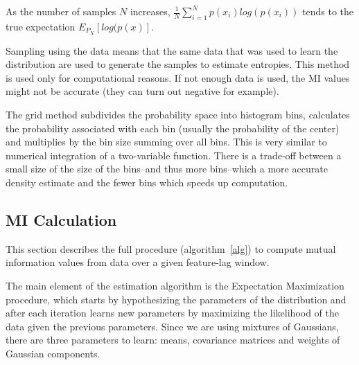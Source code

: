 \documentclass{article}
\begin{document}
As the number of samples $N$ increases, $\frac{1}{N}\sum_{i=1}^N
p(x_i) log(p(x_i)) $ tends to the true expectation $E_{P_X}[log(p(x)]$.

Sampling using the data means that the same data that was used to
learn the distribution are used to generate the samples to estimate
entropies.  This method is used only for computational reasons.  If
not enough data is used, the MI values might not be accurate (they can
turn out negative for example).

The grid method subdivides the probability space into histogram bins,
calculates the probability associated with each bin (usually the
probability of the center) and multiplies by the bin size summing over
all bins.  This is very similar to numerical integration of a
two-variable function.  There is a trade-off between a small size of the
size of the bins--and thus more bins--which a more accurate density
estimate and the fewer bins which speeds up computation.

\subsection{MI Calculation}

This section describes the full procedure (algorithm~\ref{alg}) to
compute mutual information values from data over a given feature-lag
window.

The main element of the estimation algorithm is the Expectation
Maximization procedure, which starts by hypothesizing the parameters
of the distribution and after each iteration learns new parameters by
maximizing the likelihood of the data given the previous parameters.
Since we are using mixtures of Gaussians, there are three parameters
to learn: means, covariance matrices and weights of Gaussian
components.
\end{document}
